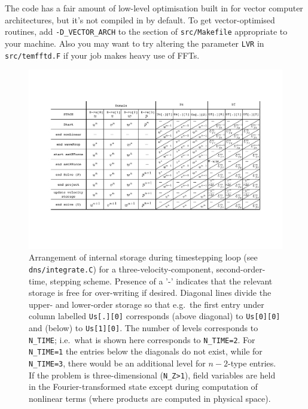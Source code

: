 \documentclass[11pt]{report}
\begin{document}
The code has a fair amount of low-level optimisation built in for
vector computer architectures, but it's not compiled in by default. To
get vector-optimised routines, add \verb+-D_VECTOR_ARCH+ to the
section of \texttt{src/Makefile} appropriate to your machine. Also you
may want to try altering the parameter \texttt{LVR} in
\texttt{src/temfftd.F} if your job makes heavy use of FFTs.

\begin{figure}
\begin{center}
\includegraphics[viewport=72 130 770 492,width=\textwidth,clip=true]
{timeSchemeStorage}
\end{center}
\caption{Arrangement of internal storage during timestepping loop (see
  \texttt{dns/integrate.C}) for a three-velocity-component,
  second-order-time, stepping scheme. Presence of a '-' indicates that
  the relevant storage is free for over-writing if desired.  Diagonal
  lines divide the upper- and lower-order storage so that e.g.\ the
  first entry under column labelled \texttt{Us[.][0]} corresponds
  (above diagonal) to \texttt{Us[0][0]} and (below) to
  \texttt{Us[1][0]}.
%
  The number of levels corresponds to
  \texttt{N\_TIME}; i.e.\ what is shown here corresponds to
  \texttt{N\_TIME=2}.  For \texttt{N\_TIME=1} the entries below the
  diagonals do not exist, while for \texttt{N\_TIME=3}, there would be
  an additional level for $n-2$-type entries.
%
  If the problem is three-dimensional (\texttt{N\_Z>1}), field
  variables are held in the Fourier-transformed state except during
  computation of nonlinear terms (where products are computed in
  physical space). }
\label{fig.storage}
\end{figure}
\end{document}
